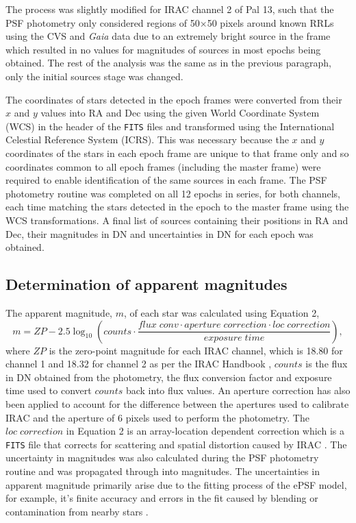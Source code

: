 \documentclass[11pt]{iopart}
\begin{document}
The process was slightly modified for IRAC channel 2 of Pal 13, such that the PSF photometry only considered regions of 50$\times$50 pixels around known RRLs using the CVS and \textit{Gaia} data due to an extremely bright source in the frame which resulted in no values for magnitudes of sources in most epochs being obtained. The rest of the analysis was the same as in the previous paragraph, only the initial sources stage was changed.

The coordinates of stars detected in the epoch frames were converted from their $x$ and $y$ values into RA and Dec using the given World Coordinate System (WCS) \cite{astropy} in the header of the \verb"FITS" files and transformed using the International Celestial Reference System (ICRS). This was necessary because the $x$ and $y$ coordinates of the stars in each epoch frame are unique to that frame only and so coordinates common to all epoch frames (including the master frame) were required to enable identification of the same sources in each frame. The PSF photometry routine was completed on all 12 epochs in series, for both channels, each time matching the stars detected in the epoch to the master frame using the WCS transformations. A final list of sources containing their positions in RA and Dec, their magnitudes in DN and uncertainties in DN for each epoch was obtained.

\subsection{Determination of apparent magnitudes}

The apparent magnitude, $m$, of each star was calculated using Equation 2,
\begin{equation}
\label{eq:mag}
    m = ZP - 2.5\log_{10} \left(counts \cdot \frac{flux\;conv \cdot aperture\;correction \cdot loc\;correction}{exposure\;time}\right),
\end{equation}
where $ZP$ is the zero-point magnitude for each IRAC channel, which is 18.80 for channel 1 and 18.32 for channel 2 as per the IRAC Handbook \cite{irachandbook}, $counts$ is the flux in DN obtained from the photometry, the flux conversion factor and exposure time used to convert $counts$ back into flux values. An aperture correction has also been applied to account for the difference between the apertures used to calibrate IRAC and the aperture of 6 pixels used to perform the photometry. The $loc\;correction$ in Equation 2 is an array-location dependent correction which is a \verb"FITS" file that corrects for scattering and spatial distortion caused by IRAC \cite{irachandbook}. The uncertainty in magnitudes was also calculated during the PSF photometry routine and was propagated through into magnitudes. The uncertainties in apparent magnitude primarily arise due to the fitting process of the ePSF model, for example, it's finite accuracy and errors in the fit caused by blending or contamination from nearby stars \cite{stetson1987}.
\end{document}
